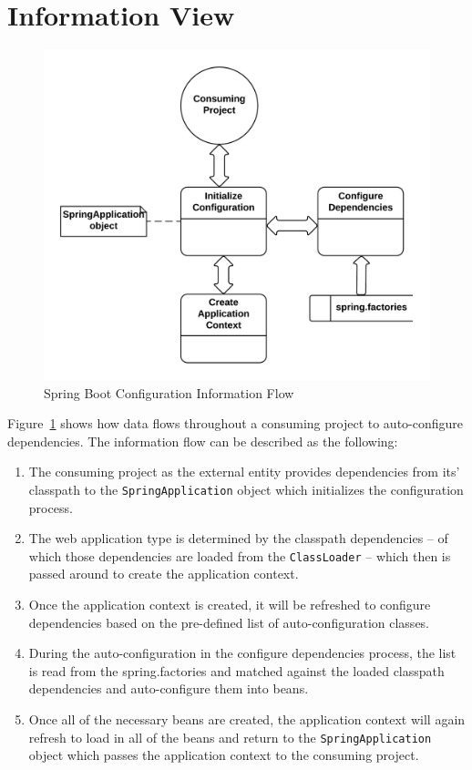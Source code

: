\section{Information View}

\begin{figure}[H]
    \centering
    \includegraphics[width=.75\textwidth]{content/architectural-views-top-level/information-flow.png}
    \caption{Spring Boot Configuration Information Flow}
    \label{information-flow-diagram}
\end{figure}

Figure~\ref{information-flow-diagram} shows how data flows throughout a consuming project to auto-configure dependencies. The information flow can be described as the following:

\begin{enumerate}
\item The consuming project as the external entity provides dependencies from its' classpath to the \texttt{SpringApplication} object which initializes the configuration process.
\item The web application type is determined by the classpath dependencies -- of which those dependencies are loaded from the \texttt{ClassLoader} -- which then is passed around to create the application context.
\item Once the application context is created, it will be refreshed to configure dependencies based on the pre-defined list of auto-configuration classes.
\item During the auto-configuration in the configure dependencies process, the list is read from the spring.factories and matched against the loaded classpath dependencies and auto-configure them into beans.
\item Once all of the necessary beans are created, the application context will again refresh to load in all of the beans and return to the \texttt{SpringApplication} object which passes the application context to the consuming project.
\end{enumerate}

